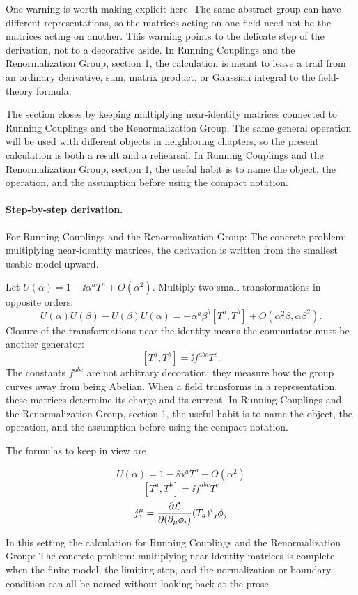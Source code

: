One warning is worth making explicit here.  The same abstract group can have different representations, so the matrices acting on one field need not be the matrices acting on another.  This warning points to the delicate step of the derivation, not to a decorative aside.  In Running Couplings and the Renormalization Group, section 1, the calculation is meant to leave a trail from an ordinary derivative, sum, matrix product, or Gaussian integral to the field-theory formula.

The section closes by keeping multiplying near-identity matrices connected to Running Couplings and the Renormalization Group.  The same general operation will be used with different objects in neighboring chapters, so the present calculation is both a result and a rehearsal.  In Running Couplings and the Renormalization Group, section 1, the useful habit is to name the object, the operation, and the assumption before using the compact notation.



\paragraph{Step-by-step derivation.}

For Running Couplings and the Renormalization Group: The concrete problem: multiplying near-identity matrices, the derivation is written from the smallest usable model upward.

Let \(U(\alpha)=1-\ii\alpha^aT^a+O(\alpha^2)\).  Multiply two small transformations in opposite orders:
\[
  U(\alpha)U(\beta)-U(\beta)U(\alpha)
  =
  -\alpha^a\beta^b[T^a,T^b]+O(\alpha^2\beta,\alpha\beta^2).
\]
Closure of the transformations near the identity means the commutator must be another generator:
\[
  [T^a,T^b]=\ii f^{abc}T^c.
\]
The constants \(f^{abc}\) are not arbitrary decoration; they measure how the group curves away from being Abelian.  When a field transforms in a representation, these matrices determine its charge and its current.  In Running Couplings and the Renormalization Group, section 1, the useful habit is to name the object, the operation, and the assumption before using the compact notation.

The formulas to keep in view are

\[
  U(\alpha)=1-\ii\alpha^aT^a+O(\alpha^2)
\]
\[
  [T^a,T^b]=\ii f^{abc}T^c
\]
\[
  j^\mu_a=\frac{\partial\mathcal L}{\partial(\partial_\mu\phi_i)}(T_a)^i{}_j\phi_j
\]

In this setting the calculation for Running Couplings and the Renormalization Group: The concrete problem: multiplying near-identity matrices is complete when the finite model, the limiting step, and the normalization or boundary condition can all be named without looking back at the prose.




